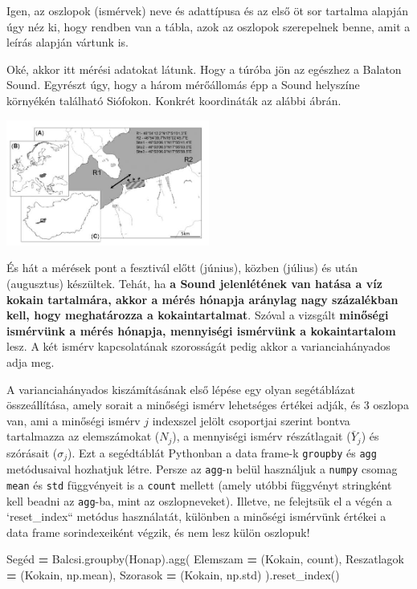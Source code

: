 \documentclass[
]{book}
\newenvironment{Shaded}{\begin{snugshade}}{\end{snugshade}}
\newcommand{\NormalTok}[1]{#1}
\newcommand{\OperatorTok}[1]{\textcolor[rgb]{0.81,0.36,0.00}{\textbf{#1}}}
\newcommand{\StringTok}[1]{\textcolor[rgb]{0.31,0.60,0.02}{#1}}
\begin{document}
Igen, az oszlopok (ismérvek) neve és adattípusa és az első öt sor tartalma alapján úgy néz ki, hogy rendben van a tábla, azok az oszlopok szerepelnek benne, amit a leírás alapján vártunk is.

Oké, akkor itt mérési adatokat látunk. Hogy a túróba jön az egészhez a Balaton Sound. Egyrészt úgy, hogy a három mérőállomás épp a Sound helyszíne környékén található Siófokon. Konkrét koordináták az alábbi ábrán.

\includegraphics[width=0.5\textwidth,height=\textheight]{balcsi.jpg}

És hát a mérések pont a fesztivál előtt (június), közben (július) és után (augusztus) készültek. Tehát, ha \textbf{a Sound jelenlétének van hatása a víz kokain tartalmára, akkor a mérés hónapja aránylag nagy százalékban kell, hogy meghatározza a kokaintartalmat}. Szóval a vizsgált \textbf{minőségi ismérvünk a mérés hónapja, mennyiségi ismérvünk a kokaintartalom} lesz. A két ismérv kapcsolatának szorosságát pedig akkor a varianciahányados adja meg.

A varianciahányados kiszámításának első lépése egy olyan segétáblázat összeállítása, amely sorait a minőségi ismérv lehetséges értékei adják, és 3 oszlopa van, ami a minőségi ismérv \(j\) indexszel jelölt csoportjai szerint bontva tartalmazza az elemszámokat (\(N_j\)), a mennyiségi ismérv részátlagait (\(\bar{Y}_j\)) és szórásait (\(\sigma_j\)).
Ezt a segédtáblát Pythonban a data frame-k \texttt{groupby} és \texttt{agg} metódusaival hozhatjuk létre. Persze az \texttt{agg}-n belül használjuk a \texttt{numpy} csomag \texttt{mean} és \texttt{std} függvényeit is a \texttt{count} mellett (amely utóbbi függvényt stringként kell beadni az \texttt{agg}-ba, mint az oszlopneveket). Illetve, ne felejtsük el a végén a `reset\_index`` metódus használatát, különben a minőségi ismérvünk értékei a data frame sorindexeiként végzik, és nem lesz külön oszlopuk!

\begin{Shaded}
\begin{Highlighting}[]
\NormalTok{Segéd }\OperatorTok{=}\NormalTok{ Balcsi.groupby(}\StringTok{\textquotesingle{}Honap\textquotesingle{}}\NormalTok{).agg(}
\NormalTok{  Elemszam }\OperatorTok{=}\NormalTok{ (}\StringTok{\textquotesingle{}Kokain\textquotesingle{}}\NormalTok{, }\StringTok{\textquotesingle{}count\textquotesingle{}}\NormalTok{),}
\NormalTok{  Reszatlagok }\OperatorTok{=}\NormalTok{ (}\StringTok{\textquotesingle{}Kokain\textquotesingle{}}\NormalTok{, np.mean),}
\NormalTok{  Szorasok }\OperatorTok{=}\NormalTok{ (}\StringTok{\textquotesingle{}Kokain\textquotesingle{}}\NormalTok{, np.std)}
\NormalTok{).reset\_index()}
\end{Highlighting}
\end{Shaded}
\end{document}
